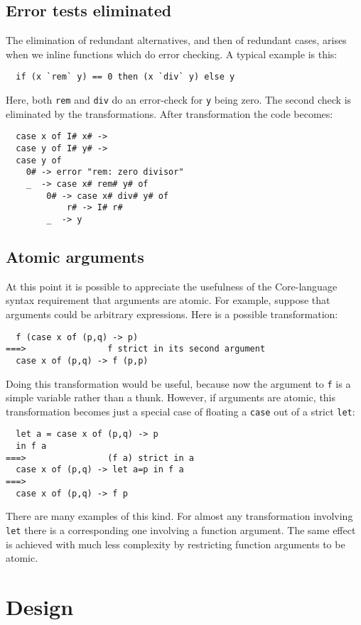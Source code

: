 \documentclass[11pt]{article}
\begin{document}
\subsection{Error tests eliminated}

The elimination of redundant alternatives, and then of redundant cases,
arises when we inline functions which do error checking.  A typical
example is this:
\begin{lstlisting}
  if (x `rem` y) == 0 then (x `div` y) else y
\end{lstlisting}
Here, both \texttt{rem} and \texttt{div} do an error-check for \texttt{y} being zero.
The second check is eliminated by the transformations.
After transformation the code becomes:
\begin{lstlisting}
  case x of I# x# ->
  case y of I# y# ->
  case y of 
    0# -> error "rem: zero divisor"
    _  -> case x# rem# y# of
	    0# -> case x# div# y# of
		    r# -> I# r#
	    _  -> y
\end{lstlisting}

\subsection{Atomic arguments}

At this point it is possible to appreciate the usefulness of
the Core-language syntax requirement that arguments are atomic.
For example, suppose that arguments could be arbitrary expressions.
Here is a possible transformation:
\begin{lstlisting}
  f (case x of (p,q) -> p)
===>				f strict in its second argument
  case x of (p,q) -> f (p,p)
\end{lstlisting}
Doing this transformation would be useful, because now the
argument to \texttt{f} is a simple variable rather than a thunk.
However, if arguments are atomic, this transformation becomes
just a special case of floating a \texttt{case} out of a strict \texttt{let}:
\begin{lstlisting}
  let a = case x of (p,q) -> p
  in f a
===>				(f a) strict in a
  case x of (p,q) -> let a=p in f a
===>
  case x of (p,q) -> f p
\end{lstlisting}
There are many examples of this kind.  For almost any transformation
involving \texttt{let} there is a corresponding one involving a function
argument.  The same effect is achieved with much less complexity
by restricting function arguments to be atomic.

\section{Design}
\end{document}
